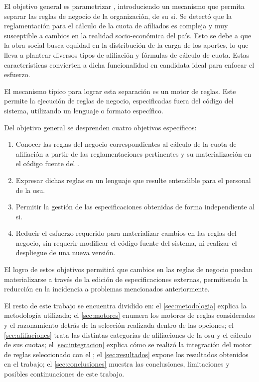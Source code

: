 El objetivo general es parametrizar {\SIDOSPU}, introduciendo un mecanismo que permita separar las reglas de negocio de la organización, de su \acrshort{si}. 
Se detectó que la reglamentación para el cálculo de la cuota de afiliados es compleja y muy susceptible a cambios en la realidad socio-económica del país. 
Esto se debe a que la obra social busca equidad en la distribución de la carga de los aportes, lo que lleva a plantear diversos tipos de afiliación y fórmulas de cálculo de cuota. 
Estas características convierten a dicha funcionalidad en candidata ideal para enfocar el esfuerzo.

El mecanismo típico para lograr esta separación es un motor de reglas. 
Este permite la ejecución de reglas de negocio, especificadas fuera del código del sistema, utilizando un lenguaje o formato específico.

Del objetivo general se desprenden cuatro objetivos específicos:
\begin{enumerate}
    \item \label{obj:esp:extraer}
    Conocer las reglas del negocio correspondientes al cálculo de la cuota de afiliación a partir de las reglamentaciones pertinentes y su materialización en el código fuente del {\SIDOSPU}.
    \item \label{obj:esp:intelegible}
    Expresar dichas reglas en un lenguaje que resulte entendible para el personal de la \acrlong{osu}.
    \item \label{obj:esp:independiente}
    Permitir la gestión de las especificaciones obtenidas de forma independiente al \acrshort{si}.
    \item \label{obj:esp:esfuerzo}
    Reducir el esfuerzo requerido para materializar cambios en las reglas del negocio, sin requerir modificar el código fuente del sistema, ni realizar el despliegue de una nueva versión.
\end{enumerate}

El logro de estos objetivos permitirá que cambios en las reglas de negocio puedan materializarse a través de la edición de especificaciones externas,  permitiendo la reducción en la incidencia a problemas mencionados anteriormente.



El resto de este trabajo se encuentra dividido en:
el \cref{sec:metodologia} explica la metodología utilizada; 
el \cref{sec:motores} enumera los motores de reglas considerados y el razonamiento detrás de la selección realizada dentro de las opciones;
el \cref{sec:afiliaciones} trata las distintas categorías de afiliaciones de la \acrshort{osu} y el cálculo de sus cuotas;
el \cref{sec:integracion} explica cómo se realizó la integración del motor de reglas seleccionado con el {\SIOSU};
el \cref{sec:resultados} expone los resultados obtenidos en el trabajo;
el \cref{sec:conclusiones} muestra las conclusiones, limitaciones y posibles continuaciones de este trabajo.
